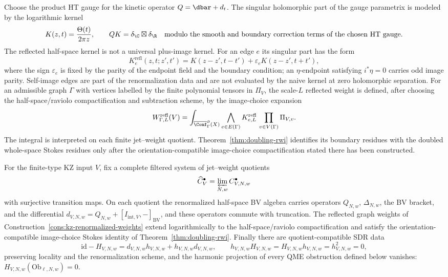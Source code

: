 \begin{construction}
\label{cons:kz-renormalized-weights}
Choose the product HT gauge for the kinetic operator
$Q=\dbar+d_t$. The singular holomorphic part of the gauge parametrix is
modeled by the logarithmic kernel
\[
K(z,t)=\frac{\Theta(t)}{2\pi z},
\qquad
QK=\delta_\C\boxtimes\delta_\R
\quad\text{modulo the smooth and boundary correction terms of the
chosen HT gauge}.
\]
The reflected half-space kernel is not a universal plus-image kernel.
For an edge $e$ its singular part has the form
\[
K^{\mathrm{refl}}_e(z,t;z',t')
=
K(z-z',t-t')+\varepsilon_e K(z-z',t+t'),
\]
where the sign $\varepsilon_e$ is fixed by the parity of the endpoint
field and the boundary condition; an $\eta$-endpoint satisfying
$i^*\eta=0$ carries odd image parity. Self-image edges are part of the
renormalization data and are not evaluated by the naive kernel at zero
holomorphic separation.
For an admissible graph $\Gamma$ with vertices labelled by the
finite polynomial tensors in $\Pi_V$, the scale-$L$ reflected weight is
defined, after choosing the half-space/raviolo compactification and
subtraction scheme, by the image-choice expansion
\[
W_{\Gamma,L}^{\mathrm{refl}}(V)
=
\int_{\overline{\Conf}^{\partial}_{\Gamma}(X)}
\bigwedge_{e\in E(\Gamma)} K^{\mathrm{refl}}_{e,L}\,
\prod_{v\in V(\Gamma)}\Pi_{V,v}.
\]
The integral is interpreted on each finite jet--weight quotient.
Theorem~\ref{thm:doubling-rwi} identifies its boundary residues with
the doubled whole-space Stokes residues only after the
orientation-compatible image-choice compactification stated there has
been constructed.
\end{construction}

\begin{assumption}
\label{assum:kz-analytic-sdr-package}
For the finite-type KZ input $V$, fix a complete filtered system of
jet--weight quotients
\[
\widehat C_V^\bullet=\varprojlim_{N,w}C_{V,N,w}^\bullet
\]
with surjective transition maps. On each quotient the renormalized
half-space BV algebra carries operators
$Q_{N,w}$, $\Delta_{N,w}$, the BV bracket, and the differential
$d_{V,N,w}=Q_{N,w}+[I_{\mathrm{int},V},{-}]_{\mathrm{BV}}$, and these
operators commute with truncation. The reflected graph weights of
Construction~\ref{cons:kz-renormalized-weights} extend logarithmically
to the half-space/raviolo compactification and satisfy the
orientation-compatible image-choice Stokes identity of
Theorem~\ref{thm:doubling-rwi}. Finally there are quotient-compatible
SDR data
\[
\mathrm{id}-H_{V,N,w}
=d_{V,N,w}h_{V,N,w}+h_{V,N,w}d_{V,N,w},
\qquad
h_{V,N,w}H_{V,N,w}=H_{V,N,w}h_{V,N,w}=h_{V,N,w}^2=0,
\]
preserving locality and the renormalization scheme, and the harmonic
projection of every QME obstruction defined below vanishes:
$H_{V,N,w}(\mathrm{Ob}_{\ell,N,w})=0$.
\end{assumption}

